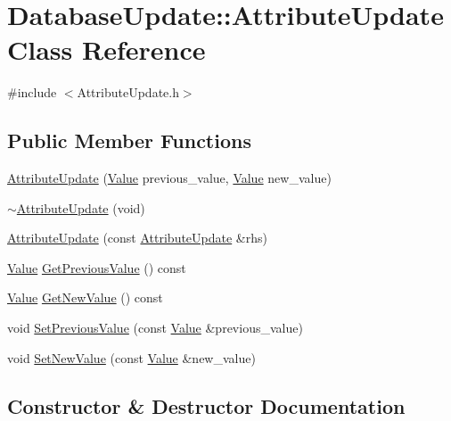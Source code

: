 \hypertarget{class_database_update_1_1_attribute_update}{}\section{Database\+Update\+:\+:Attribute\+Update Class Reference}
\label{class_database_update_1_1_attribute_update}


{\ttfamily \#include $<$Attribute\+Update.\+h$>$}

\subsection*{Public Member Functions}
\begin{DoxyCompactItemize}
\item 
\hyperlink{class_database_update_1_1_attribute_update_a2b28a22faa69ab4b39723c15ca4ed440}{Attribute\+Update} (\hyperlink{class_value}{Value} previous\+\_\+value, \hyperlink{class_value}{Value} new\+\_\+value)
\item 
\hyperlink{class_database_update_1_1_attribute_update_a2763d0921bcddbe0ea11a8fa15fe7b27}{$\sim$\+Attribute\+Update} (void)
\item 
\hyperlink{class_database_update_1_1_attribute_update_aea529452fda468a5d80754b39c5971e1}{Attribute\+Update} (const \hyperlink{class_database_update_1_1_attribute_update}{Attribute\+Update} \&rhs)
\item 
\hyperlink{class_value}{Value} \hyperlink{class_database_update_1_1_attribute_update_ac71fb094ee9e63b92e43b0213948d77d}{Get\+Previous\+Value} () const 
\item 
\hyperlink{class_value}{Value} \hyperlink{class_database_update_1_1_attribute_update_a531f3795ac82f83a7f1726e5b5f62d17}{Get\+New\+Value} () const 
\item 
void \hyperlink{class_database_update_1_1_attribute_update_aa003a65295c39cdb4603bf4a15db5c85}{Set\+Previous\+Value} (const \hyperlink{class_value}{Value} \&previous\+\_\+value)
\item 
void \hyperlink{class_database_update_1_1_attribute_update_a9a8ee9c69a3aa8df9d1cec59ffa108b8}{Set\+New\+Value} (const \hyperlink{class_value}{Value} \&new\+\_\+value)
\end{DoxyCompactItemize}


\subsection{Constructor \& Destructor Documentation}
\hypertarget{class_database_update_1_1_attribute_update_a2b28a22faa69ab4b39723c15ca4ed440}{}
